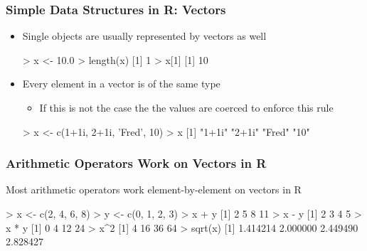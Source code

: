 \documentclass{beamer}
\begin{document}
\begin{frame}[fragile]
  \frametitle{Simple Data Structures in R: Vectors}

\begin{itemize}

\item Single objects are usually represented by vectors as well
\begin{Rcode}
> x <- 10.0
> length(x)
[1] 1
> x[1]
[1] 10
\end{Rcode}


\item Every element in a vector is of the same type

\begin{itemize}
	\item If this is not the case the the values are coerced to enforce this rule
\end{itemize}

\begin{Rcode}
> x <- c(1+1i, 2+1i, 'Fred', 10)
> x
[1] "1+1i" "2+1i" "Fred" "10"  
\end{Rcode}

\end{itemize}

\end{frame}


\begin{frame}[fragile]
  \frametitle{Arithmetic Operators Work on Vectors in R}

Most arithmetic operators work element-by-element on vectors in R

\begin{Rcode}
> x <- c(2, 4, 6, 8)
> y <- c(0, 1, 2, 3)
> x + y
[1]  2  5  8 11
> x - y
[1] 2 3 4 5
> x * y
[1]  0  4 12 24
> x^2
[1]  4 16 36 64
> sqrt(x)
[1] 1.414214 2.000000 2.449490 2.828427
\end{Rcode}

\end{frame}
\end{document}
